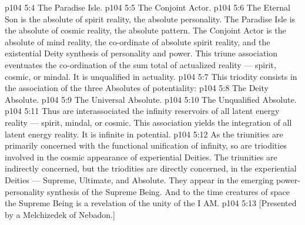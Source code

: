 \vs p104 5:4 \bibnobreakspace The Paradise Isle.
\vs p104 5:5 \bibnobreakspace The Conjoint Actor.
\vs p104 5:6 \pc The Eternal Son is the absolute of spirit reality, the absolute personality. The Paradise Isle is the absolute of cosmic reality, the absolute pattern. The Conjoint Actor is the absolute of mind reality, the co\hyp{}ordinate of absolute spirit reality, and the existential Deity synthesis of personality and power. This triune association eventuates the co\hyp{}ordination of the sum total of actualized reality --- spirit, cosmic, or mindal. It is unqualified in actuality.
\vs p104 5:7 \pc {} This triodity consists in the association of the three Absolutes of potentiality:
\vs p104 5:8 \bibnobreakspace The Deity Absolute.
\vs p104 5:9 \bibnobreakspace The Universal Absolute.
\vs p104 5:10 \bibnobreakspace The Unqualified Absolute.
\vs p104 5:11 \pc Thus are interassociated the infinity reservoirs of all latent energy reality --- spirit, mindal, or cosmic. This association yields the integration of all latent energy reality. It is infinite in potential.
\vs p104 5:12 \pc As the triunities are primarily concerned with the functional unification of infinity, so are triodities involved in the cosmic appearance of experiential Deities. The triunities are indirectly concerned, but the triodities are directly concerned, in the experiential Deities --- Supreme, Ultimate, and Absolute. They appear in the emerging power\hyp{}personality synthesis of the Supreme Being. And to the time creatures of space the Supreme Being is a revelation of the unity of the I AM.
\vsetoff
\vs p104 5:13 [Presented by a Melchizedek of Nebadon.]
